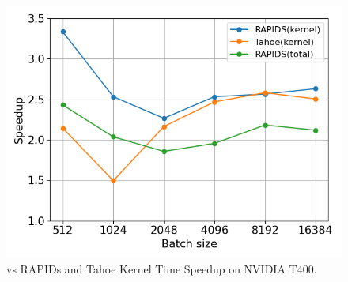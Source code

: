 \begin{figure}[htb]
  \centering
  \includegraphics[width=0.75\linewidth]{figures/geomean_speedup_T400_kernel_time.png}
  \caption{\Treebeard{} vs RAPIDs and Tahoe Kernel Time Speedup on NVIDIA T400.}
  \label{Fig:TBvsRAPIDsTahoe_T400_Speedup}
\end{figure}



